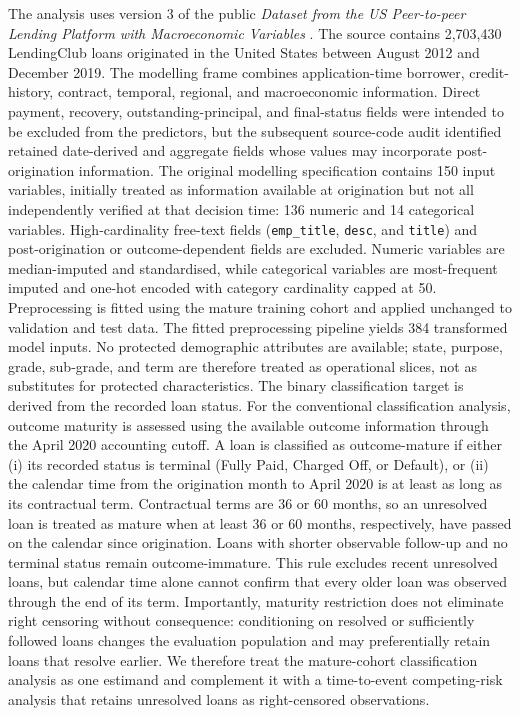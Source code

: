 \documentclass[10pt]{article}
\begin{document}
The analysis uses version 3 of the public \textit{Dataset from the US Peer-to-peer Lending Platform with Macroeconomic Variables} \cite{ref48}. The source contains 2,703,430 LendingClub loans originated in the United States between August 2012 and December 2019. The modelling frame combines application-time borrower, credit-history, contract, temporal, regional, and macroeconomic information. Direct payment, recovery, outstanding-principal, and final-status fields were intended to be excluded from the predictors, but the subsequent source-code audit identified retained date-derived and aggregate fields whose values may incorporate post-origination information. The original modelling specification contains 150 input variables, initially treated as information available at origination but not all independently verified at that decision time: 136 numeric and 14 categorical variables. High-cardinality free-text fields (\texttt{emp\_title}, \texttt{desc}, and \texttt{title}) and post-origination or outcome-dependent fields are excluded. Numeric variables are median-imputed and standardised, while categorical variables are most-frequent imputed and one-hot encoded with category cardinality capped at 50. Preprocessing is fitted using the mature training cohort and applied unchanged to validation and test data. The fitted preprocessing pipeline yields 384 transformed model inputs. No protected demographic attributes are available; state, purpose, grade, sub-grade, and term are therefore treated as operational slices, not as substitutes for protected characteristics. The binary classification target is derived from the recorded loan status. For the conventional classification analysis, outcome maturity is assessed using the available outcome information through the April 2020 accounting cutoff. A loan is classified as outcome-mature if either (i) its recorded status is terminal (Fully Paid, Charged Off, or Default), or (ii) the calendar time from the origination month to April 2020 is at least as long as its contractual term. Contractual terms are 36 or 60 months, so an unresolved loan is treated as mature when at least 36 or 60 months, respectively, have passed on the calendar since origination. Loans with shorter observable follow-up and no terminal status remain outcome-immature. This rule excludes recent unresolved loans, but calendar time alone cannot confirm that every older loan was observed through the end of its term. Importantly, maturity restriction does not eliminate right censoring without consequence: conditioning on resolved or sufficiently followed loans changes the evaluation population and may preferentially retain loans that resolve earlier. We therefore treat the mature-cohort classification analysis as one estimand and complement it with a time-to-event competing-risk analysis that retains unresolved loans as right-censored observations.
\end{document}
